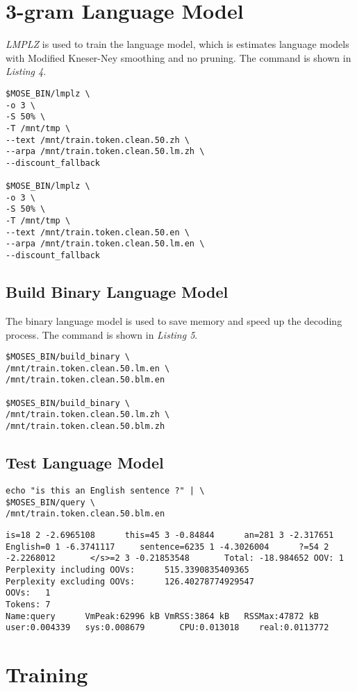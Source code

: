 \documentclass[11pt]{article}
\begin{document}
\section{3-gram Language Model}
\textit{LMPLZ} is used to train the language model, which is estimates language models with Modified Kneser-Ney smoothing and no pruning. The command is shown in \textit{Listing 4}.

\begin{lstlisting}[caption={Build Language Model}]
$MOSE_BIN/lmplz \
-o 3 \
-S 50% \
-T /mnt/tmp \
--text /mnt/train.token.clean.50.zh \
--arpa /mnt/train.token.clean.50.lm.zh \
--discount_fallback

$MOSE_BIN/lmplz \
-o 3 \
-S 50% \
-T /mnt/tmp \
--text /mnt/train.token.clean.50.en \
--arpa /mnt/train.token.clean.50.lm.en \
--discount_fallback
\end{lstlisting}
\subsection{Build Binary Language Model}
The binary language model is used to save memory and speed up the decoding process. The command is shown in \textit{Listing 5}.
\begin{lstlisting}[caption={Build Binary Language Model}]
$MOSES_BIN/build_binary \
/mnt/train.token.clean.50.lm.en \
/mnt/train.token.clean.50.blm.en

$MOSES_BIN/build_binary \
/mnt/train.token.clean.50.lm.zh \
/mnt/train.token.clean.50.blm.zh
\end{lstlisting}

\subsection{Test Language Model}
\begin{lstlisting}[caption=Test Language Model]
echo "is this an English sentence ?" | \
$MOSES_BIN/query \
/mnt/train.token.clean.50.blm.en
\end{lstlisting}
\begin{lstlisting}[caption=Query Output]
is=18 2 -2.6965108      this=45 3 -0.84844      an=281 3 -2.317651      English=0 1 -6.3741117     sentence=6235 1 -4.3026004      ?=54 2 -2.2268012       </s>=2 3 -0.21853548       Total: -18.984652 OOV: 1
Perplexity including OOVs:      515.3390835409365
Perplexity excluding OOVs:      126.40278774929547
OOVs:   1
Tokens: 7
Name:query      VmPeak:62996 kB VmRSS:3864 kB   RSSMax:47872 kB user:0.004339   sys:0.008679       CPU:0.013018    real:0.0113772
\end{lstlisting}

\section{Training}
\end{document}
